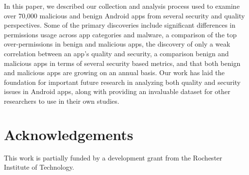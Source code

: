 \documentclass{llncs}
\begin{document}
In this paper, we described our collection and analysis process used to examine over 70,000 malicious and benign Android apps from several security and quality perspectives. Some of the primary discoveries include significant differences in permissions usage across app categories and malware, a comparison of the top over-permissions in benign and malicious apps, the discovery of only a weak correlation between an app's quality and security, a comparison benign and malicious apps in terms of several security based metrics, and that both benign and malicious apps are growing on an annual basis. Our work has laid the foundation for important future research in analyzing both quality and security issues in Android apps, along with providing an invaluable dataset for other researchers to use in their own studies.



\section*{Acknowledgements}

This work is partially funded by a development grant from the Rochester Institute of Technology.







\
\end{document}
